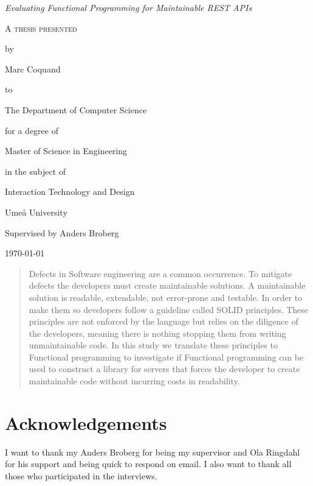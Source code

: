\documentclass[12pt]{report}
\theoremstyle{definition}
\theoremstyle{theorem}
\begin{document}
\begin{titlepage}
	\centering
    \null
    \vfill
    {\Large\itshape Evaluating Functional Programming for Maintainable
    REST APIs    \par}
    \vspace{3.0cm}
	{\scshape 
    A thesis presented \par 
    by\par
	Marc Coquand\par
	to\par
    The Department of Computer Science\par
    \vspace{0.8cm}
	for a degree of\par
    Master of Science in Engineering\par
    in the subject of\par
    Interaction Technology and Design\par}
    \vfill
    Umeå University\par
    Supervised by Anders Broberg\par
	\today\par
\end{titlepage}
\clearpage
\thispagestyle{empty}

\clearpage\newpage
\thispagestyle{empty}

\begin{abstract} 
	Defects in Software engineering are a common occurrence. To mitigate defects
the developers must create maintainable solutions. A maintainable solution is
readable, extendable, not error-prone and testable. In order to make them so
developers follow a guideline called SOLID principles.  These principles are
not enforced by the language but relies on the diligence of the developers,
meaning there is nothing stopping them from writing unmaintainable code. In
this study we translate these principles to Functional programming to
investigate if Functional programming can be used to construct a library for
servers that forces the developer to create maintainable code without 
incurring costs in readability.
\end{abstract}

\clearpage\newpage
\thispagestyle{empty}

\section*{Acknowledgements}

I want to thank my Anders Broberg for being my supervisor and Ola Ringdahl for
his support and being quick to respond on email. I also want to thank all those
who participated in the interviews.
\end{document}
